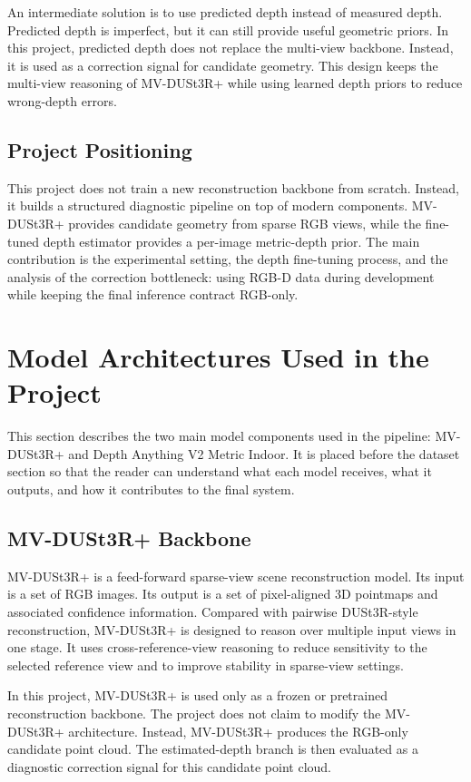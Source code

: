 \documentclass[12pt,a4paper]{article}
\newcommand{\mvdp}{MV-DUSt3R+}
\newcommand{\da}{Depth Anything V2}
\begin{document}
An intermediate solution is to use predicted depth instead of measured depth. Predicted depth is imperfect, but it can still provide useful geometric priors. In this project, predicted depth does not replace the multi-view backbone. Instead, it is used as a correction signal for candidate geometry. This design keeps the multi-view reasoning of \mvdp{} while using learned depth priors to reduce wrong-depth errors.

\subsection{Project Positioning}
This project does not train a new reconstruction backbone from scratch. Instead, it builds a structured diagnostic pipeline on top of modern components. \mvdp{} provides candidate geometry from sparse RGB views, while the fine-tuned depth estimator provides a per-image metric-depth prior. The main contribution is the experimental setting, the depth fine-tuning process, and the analysis of the correction bottleneck: using RGB-D data during development while keeping the final inference contract RGB-only.

\section{Model Architectures Used in the Project}
This section describes the two main model components used in the pipeline: \mvdp{} and \da{} Metric Indoor. It is placed before the dataset section so that the reader can understand what each model receives, what it outputs, and how it contributes to the final system.

\subsection{MV-DUSt3R+ Backbone}
\mvdp{} is a feed-forward sparse-view scene reconstruction model. Its input is a set of RGB images. Its output is a set of pixel-aligned 3D pointmaps and associated confidence information. Compared with pairwise DUSt3R-style reconstruction, \mvdp{} is designed to reason over multiple input views in one stage. It uses cross-reference-view reasoning to reduce sensitivity to the selected reference view and to improve stability in sparse-view settings.

In this project, \mvdp{} is used only as a frozen or pretrained reconstruction backbone. The project does not claim to modify the \mvdp{} architecture. Instead, \mvdp{} produces the RGB-only candidate point cloud. The estimated-depth branch is then evaluated as a diagnostic correction signal for this candidate point cloud.
\end{document}
